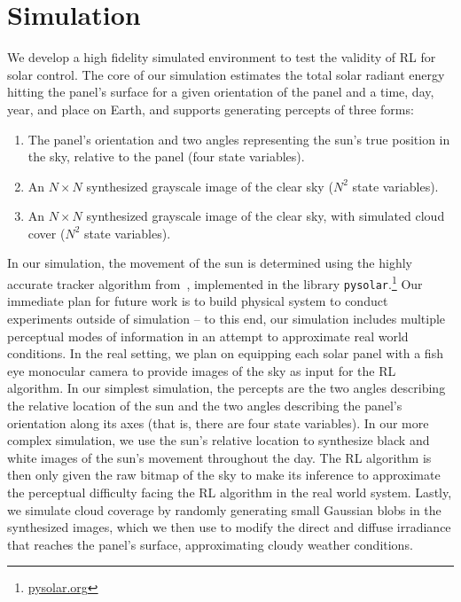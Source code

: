 \documentclass{article}
\begin{document}


\section{Simulation}
\label{sec:simulation}

We develop a high fidelity simulated environment to test the validity of RL for solar control. The core of our simulation estimates the total solar radiant energy hitting the panel's surface for a given orientation of the panel and a time, day, year, and place on Earth, and supports generating percepts of three forms:
\begin{enumerate}
\item The panel's orientation and two angles representing the sun's true position in the sky, relative to the panel (four state variables).
\item An $N\times N$ synthesized grayscale image of the clear sky ($N^2$ state variables).
\item An $N\times N$ synthesized grayscale image of the clear sky, with simulated cloud cover ($N^2$ state variables).
\end{enumerate}

In our simulation, the movement of the sun is determined using the highly accurate tracker algorithm from~\citet{reda2004solar}, implemented in the library \texttt{pysolar}.\footnote{\url{pysolar.org}} Our immediate plan for future work is to build physical system to conduct experiments outside of simulation -- to this end, our simulation includes multiple perceptual modes of information in an attempt to approximate real world conditions. In the real setting, we plan on equipping each solar panel with a fish eye monocular camera to provide images of the sky as input for the RL algorithm. In our simplest simulation, the percepts are the two angles describing the relative location of the sun and the two angles describing the panel's orientation along its axes (that is, there are four state variables). In our more complex simulation, we use the sun's relative location to synthesize black and white images of the sun's movement throughout the day. The RL algorithm is then only given the raw bitmap of the sky to make its inference to approximate the perceptual difficulty facing the RL algorithm in the real world system. Lastly, we simulate cloud coverage by randomly generating small Gaussian blobs in the synthesized images, which we then use to modify the direct and diffuse irradiance that reaches the panel's surface, approximating cloudy weather conditions.
\end{document}
